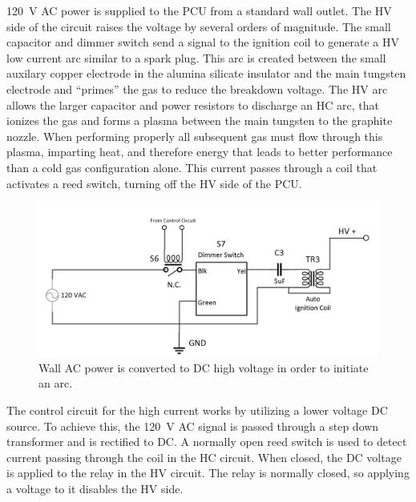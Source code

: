 \documentclass[journal]{IEEEtran}
\begin{document}
\SI{120}{\volt} AC power is supplied to the PCU from a standard wall outlet.
The HV side of the circuit raises the voltage by several orders of magnitude.
The small capacitor and dimmer switch send a signal to the ignition coil to generate a HV low current arc similar to a spark plug.
This arc is created between the small auxilary copper electrode in the alumina silicate insulator and the main tungsten electrode and ``primes'' the gas to reduce the breakdown voltage.
The HV arc allows the larger capacitor and power resistors to discharge an HC arc, that ionizes the gas and forms a plasma between the main tungsten to the graphite nozzle.
When performing properly all subsequent gas must flow through this plasma, imparting heat, and therefore energy that leads to better performance than a cold gas configuration alone.
This current passes through a coil that activates a reed switch, turning off the HV side of the PCU.\@

\begin{figure}[htp]
  \includegraphics[width=\linewidth]{figs/hv-schematic.png}
  \caption{Wall AC power is converted to DC high voltage in order to initiate an arc.
\label{fig:hv-circuit}
}
\end{figure}

The control circuit for the high current works by utilizing a lower voltage DC source.
To achieve this, the \SI{120}{\volt} AC signal is passed through a step down transformer and is rectified to DC.\@
A normally open reed switch is used to detect current passing through the coil in the HC circuit.
When closed, the DC voltage is applied to the relay in the HV circuit.
The relay is normally closed, so applying a voltage to it disables the HV side.
\end{document}
